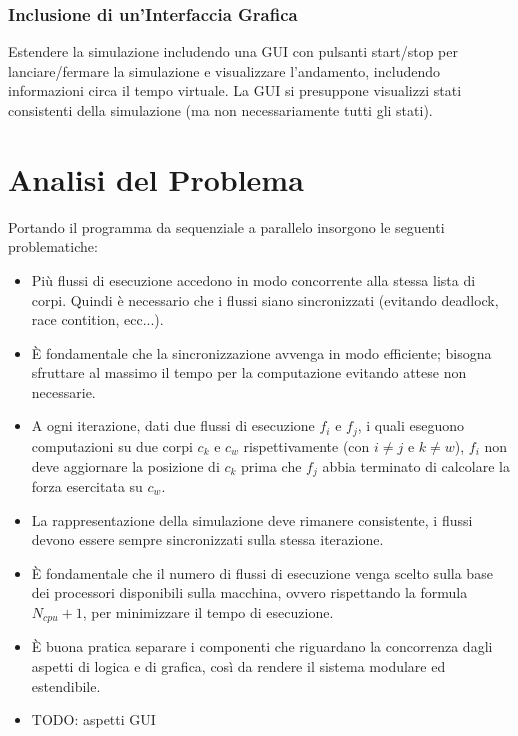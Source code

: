 \documentclass[12pt,a4paper,openright,twoside]{book}
\begin{document}
\subsection{Inclusione di un'Interfaccia Grafica}
Estendere la simulazione includendo una GUI con pulsanti start/stop per lanciare/fermare la simulazione e visualizzare l'andamento,
includendo informazioni circa il tempo virtuale.
La GUI si presuppone visualizzi stati consistenti della simulazione (ma non necessariamente tutti gli stati).
\chapter{Analisi del Problema}
\label{chap:Analisi del Problema}
Portando il programma da sequenziale a parallelo insorgono le seguenti problematiche:
\begin{itemize}
	\item Più flussi di esecuzione accedono in modo concorrente alla stessa lista di corpi.
	Quindi è necessario che i flussi siano sincronizzati (evitando deadlock, race contition, ecc...).
	\item È fondamentale che la sincronizzazione avvenga in modo efficiente; bisogna sfruttare al massimo il tempo per
	la computazione evitando attese non necessarie.
	\item A ogni iterazione, dati due flussi di esecuzione $f_{i}$ e $f_{j}$, i quali eseguono computazioni su due corpi $c_{k}$ e $c_{w}$ rispettivamente (con $i \neq j$ e $k \neq w$),
	$f_{i}$ non deve aggiornare la posizione di $c_{k}$ prima che $f_{j}$ abbia terminato di calcolare la forza esercitata su $c_{w}$.
	\item La rappresentazione della simulazione deve rimanere
	consistente, i flussi devono essere sempre sincronizzati sulla
	stessa iterazione.
	\item È fondamentale che il numero di flussi di esecuzione venga scelto sulla base dei processori disponibili sulla macchina, ovvero
	rispettando la formula $N_{cpu} + 1$, per minimizzare il tempo di esecuzione.
	\item È buona pratica separare i componenti che riguardano la concorrenza dagli aspetti di logica e di grafica,
	così da rendere il sistema modulare ed estendibile.
	\item TODO: aspetti GUI
\end{itemize}
\end{document}
